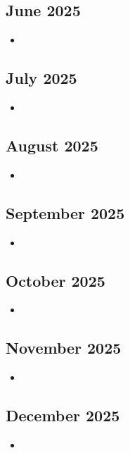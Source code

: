 \documentclass{article}
\begin{document}
\subsection {June 2025}
\begin {itemize}
	\item \textbf{}
\end {itemize}

\subsection {July 2025}
\begin {itemize}
	\item \textbf{}
\end {itemize}

\subsection {August 2025}
\begin {itemize}
	\item \textbf{}
\end {itemize}

\subsection {September 2025}
\begin {itemize}
	\item \textbf{}
\end {itemize}

\subsection {October 2025}
\begin {itemize}
	\item \textbf{}
\end {itemize}

\subsection {November 2025}
\begin {itemize}
	\item \textbf{}
\end {itemize}

\subsection {December 2025}
\begin {itemize}
	\item \textbf{}
\end {itemize}
\end{document}
